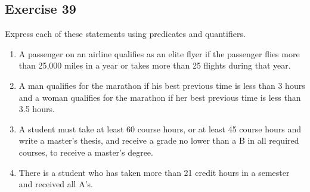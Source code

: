 \documentclass{article}
\begin{document}
\subsection*{Exercise 39}
Express each of these statements using predicates and
quantifiers.
\begin{enumerate} [label = (\alph*)]
    \item A passenger on an airline qualifies as an elite flyer if the passenger flies more than 25,000 miles in a year or takes more than 25 flights during that year.
    \item A man qualifies for the marathon if his best previous time is less than 3 hours and a woman qualifies for the marathon if her best previous time is less than 3.5 hours.
    \item A student must take at least 60 course hours, or at least 45 course hours and write a master’s thesis, and receive a grade no lower than a B in all required courses, to receive a master’s degree.
    \item There is a student who has taken more than 21 credit hours in a semester and received all A’s.
\end{enumerate}
\end{document}
